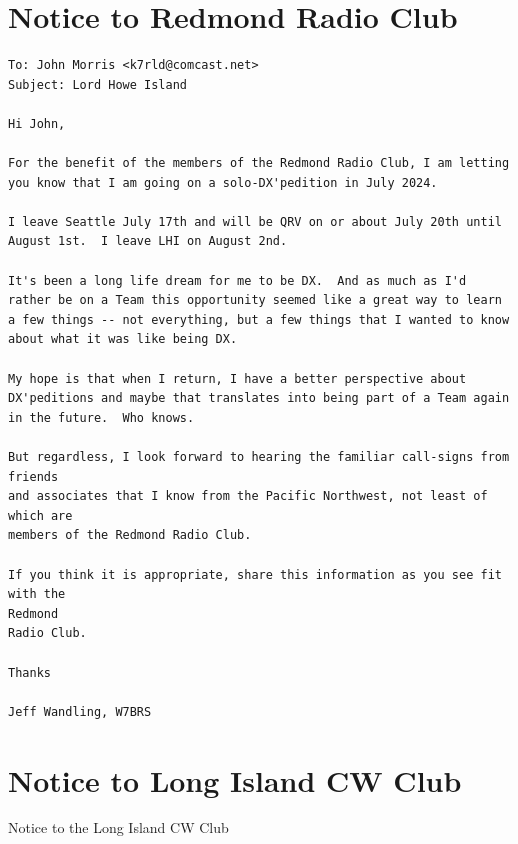 \documentclass[11pt]{article}
\begin{document}
\section{Notice to Redmond Radio Club}
\begin{Verbatim}[fontsize=\small]
To: John Morris <k7rld@comcast.net>
Subject: Lord Howe Island

Hi John,

For the benefit of the members of the Redmond Radio Club, I am letting
you know that I am going on a solo-DX'pedition in July 2024.  

I leave Seattle July 17th and will be QRV on or about July 20th until 
August 1st.  I leave LHI on August 2nd.

It's been a long life dream for me to be DX.  And as much as I'd 
rather be on a Team this opportunity seemed like a great way to learn 
a few things -- not everything, but a few things that I wanted to know 
about what it was like being DX.

My hope is that when I return, I have a better perspective about 
DX'peditions and maybe that translates into being part of a Team again 
in the future.  Who knows.

But regardless, I look forward to hearing the familiar call-signs from friends
and associates that I know from the Pacific Northwest, not least of which are
members of the Redmond Radio Club.

If you think it is appropriate, share this information as you see fit with the 
Redmond
Radio Club.

Thanks

Jeff Wandling, W7BRS
\end{Verbatim}

\section{Notice to Long Island CW Club}


Notice to the Long Island CW Club
\end{document}
